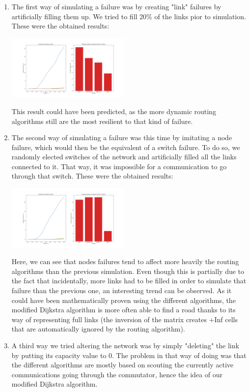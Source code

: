 \documentclass[lettersize,journal]{IEEEtran} %
\begin{document}
\begin{enumerate}
        \item The first way of simulating a failure was by creating "link" failures by artificially filling them up. We tried to fill
        20\% of the links pior to simulation. These were the obtained results:
        \begin{center}
                \includegraphics[width=0.48\textwidth]{link_failures.png}       
        \end{center}
        This result could have been predicted, as the more dynamic routing algorithms still are the most resilient to that kind of failure.
        \item The second way of simulating a failure was this time by imitating a node failure, which would then be the equivalent of a 
        switch failure. To do so, we randomly elected switches of the network and artificially filled all the links connected to it. That
        way, it was impossible for a communication to go through that switch. These were the obtained results:
        \begin{center}
                \includegraphics[width=0.48\textwidth]{node_failures.png}       
        \end{center}
        Here, we can see that nodes failures tend to affect more heavily the routing algorithms than the previous simulation. Even though
        this is partially due to the fact that incidentally, more links had to be filled in order to simulate that failure than the previous
        one, an interesting trend can be observed. As it could have been mathematically proven using the different algorithms, the modified
        Dijkstra algorithm is more often able to find a road thanks to its way of representing full links (the inversion of the matrix creates
        +Inf cells that are automatically ignored by the routing algorithm).
        \item A third way we tried altering the network was by simply "deleting" the link by putting its capacity value to 0. The problem in
        that way of doing was that the different algorithms are mostly based on scouting the currently active communications going through
        the commutator, hence the idea of our modified Dijkstra algorithm.
\end{enumerate}
\end{document}

